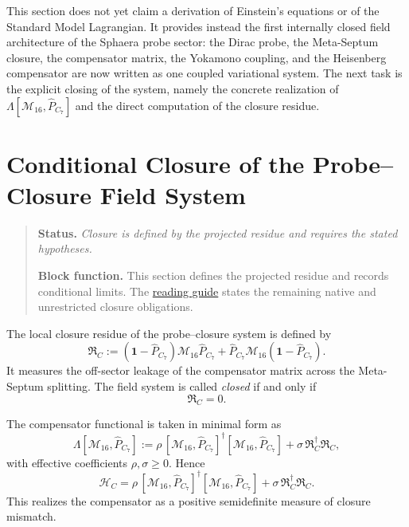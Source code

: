 \begin{remark}
This section does not yet claim a derivation of Einstein's equations or
of the Standard Model Lagrangian.
It provides instead the first internally closed field architecture of
the Sphaera probe sector: the Dirac probe, the Meta-Septum closure, the
compensator matrix, the Yokamono coupling, and the Heisenberg
compensator are now written as one coupled variational system.
The next task is the explicit closing of the system, namely the concrete
realization of $\Lambda[\mathcal M_{16},\hat P_{C_7}]$ and the direct
computation of the closure residue.

\end{remark}


\section{Conditional Closure of the Probe--Closure Field System}
\begin{quote}\small
\noindent\textbf{Status.} \emph{Closure is defined by the projected residue and requires the stated hypotheses.}\par
\noindent\textbf{Block function.} This section defines the projected residue and records conditional limits. The \hyperref[v480:reading-route]{reading guide} states the remaining native and unrestricted closure obligations.
\end{quote}
\label{sec:closure-field-system}

\begin{definition}
The local closure residue of the probe--closure system is defined by
\[
 \mathfrak R_C
 :=
 (\mathbf 1-\hat P_{C_7})\mathcal M_{16}\hat P_{C_7}
 + \hat P_{C_7}\mathcal M_{16}(\mathbf 1-\hat P_{C_7}).
\]
It measures the off-sector leakage of the compensator matrix across the
Meta-Septum splitting.
The field system is called \emph{closed} if and only if
\[
 \mathfrak R_C = 0.
\]
\end{definition}

\begin{definition}
The compensator functional is taken in minimal form as
\[
 \Lambda[\mathcal M_{16},\hat P_{C_7}]
 :=
 \rho\,[\mathcal M_{16},\hat P_{C_7}]^
 \dagger [\mathcal M_{16},\hat P_{C_7}]
 + \sigma\,\mathfrak R_C^
 \dagger \mathfrak R_C,
\]
with effective coefficients $\rho,\sigma\ge 0$.
Hence
\[
 \mathcal H_C
 =
 \rho\,[\mathcal M_{16},\hat P_{C_7}]^
 \dagger [\mathcal M_{16},\hat P_{C_7}]
 + \sigma\,\mathfrak R_C^
 \dagger \mathfrak R_C.
\]
This realizes the compensator as a positive semidefinite measure of
closure mismatch.
\end{definition}

